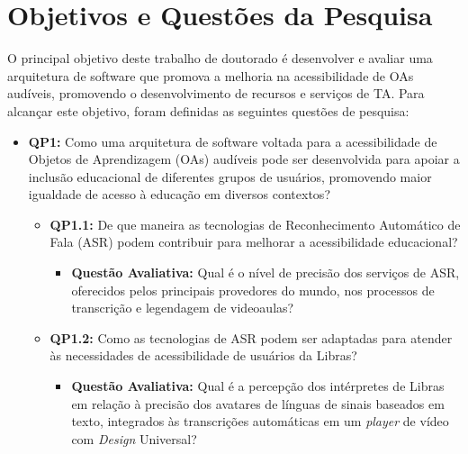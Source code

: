 \section{Objetivos e Questões da Pesquisa}

O principal objetivo deste trabalho de doutorado é desenvolver e avaliar uma arquitetura de software que promova a melhoria na acessibilidade de OAs audíveis, promovendo o desenvolvimento de recursos e serviços de TA. Para alcançar este objetivo, foram definidas as seguintes questões de pesquisa:

\begin{itemize}
    \item \textbf{QP1:} Como uma arquitetura de software voltada para a acessibilidade de Objetos de Aprendizagem (OAs) audíveis pode ser desenvolvida para apoiar a inclusão educacional de diferentes grupos de usuários, promovendo maior igualdade de acesso à educação em diversos contextos?
    
    \begin{itemize}
        \item \textbf{QP1.1:} De que maneira as tecnologias de Reconhecimento Automático de Fala (ASR) podem contribuir para melhorar a acessibilidade educacional?
        
        \begin{itemize}
            \item \textbf{Questão Avaliativa:} Qual é o nível de precisão dos serviços de ASR, oferecidos pelos principais provedores do mundo, nos processos de transcrição e legendagem de videoaulas?
        \end{itemize}
        
        \item \textbf{QP1.2:} Como as tecnologias de ASR podem ser adaptadas para atender às necessidades de acessibilidade de usuários da Libras?
        
        \begin{itemize}
            \item \textbf{Questão Avaliativa:} Qual é a percepção dos intérpretes de Libras em relação à precisão dos avatares de línguas de sinais baseados em texto, integrados às transcrições automáticas em um \textit{player} de vídeo com \textit{Design} Universal?
        \end{itemize}
    
    \end{itemize}

\end{itemize}

